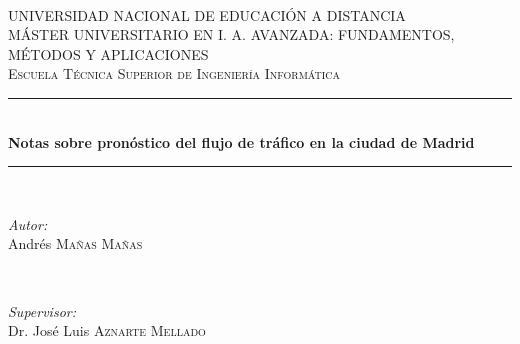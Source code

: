 \documentclass[]{book}
\title{}
\author{}
\date{}
\begin{document}
\frontmatter

\begin{titlepage}

\newcommand{\HRule}{\rule{\linewidth}{0.5mm}} %

\center %


\textsc{\large }\\[1cm] %

\textsc{\LARGE UNIVERSIDAD NACIONAL DE EDUCACIÓN A DISTANCIA}\\[1cm] %
\textsc{\Large MÁSTER UNIVERSITARIO EN I. A. AVANZADA: FUNDAMENTOS, MÉTODOS Y APLICACIONES}\\[1cm] %
\textsc{\large Escuela Técnica Superior de Ingeniería Informática}\\[2cm] %


\HRule \\[0.4cm]
{ \huge \bfseries Notas sobre pronóstico del flujo de tráfico en la ciudad de Madrid}\\[0.4cm] %
\HRule \\[1.5cm]


\begin{minipage}{0.4\textwidth}
\begin{flushleft} \large
\emph{Autor:}\\
Andrés \textsc{Mañas Mañas} %
\end{flushleft}
\end{minipage}
~
\begin{minipage}{0.4\textwidth}
\begin{flushright} \large
\emph{Supervisor:} \\
Dr. José Luis \textsc{Aznarte Mellado} %
\end{flushright}
\end{minipage}\\[2cm]


\end{titlepage}
\end{document}
